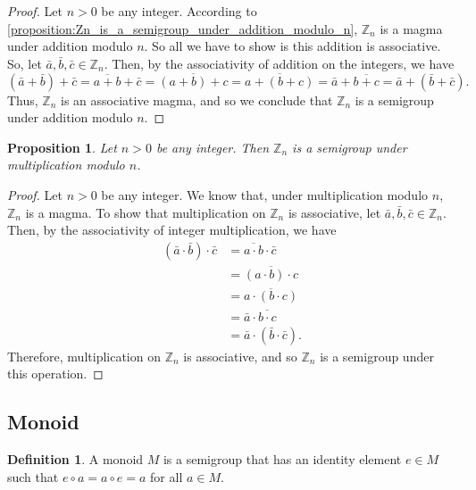 \documentclass[12pt, titlepage]{amsart}
\newcommand\Z{{\mathbb Z}}
\newtheorem{prop}{Proposition}[subsection]
\theoremstyle{definition}
\newtheorem{definition}{Definition}[subsection]
\begin{document}
	\begin{proof}
		Let $n > 0$ be any integer.
		According to \cref{proposition:Zn_is_a_semigroup_under_addition_modulo_n}, $\Z_n$ is a magma under addition modulo $n$.
		So all we have to show is this addition is associative.
		So, let $\bar{a}, \bar{b}, \bar{c} \in \Z_n$.
		Then, by the associativity of addition on the integers, we have $$(\bar{a} + \bar{b}) + \bar{c} = \overline{a + b}  + \bar{c} = \overline{(a + b) + c} = \overline{a + (b + c)} = \bar{a} + \overline{b + c} = \bar{a} + (\bar{b} + \bar{c}).$$
		Thus, $\Z_n$ is an associative magma, and so we conclude that $\Z_n$ is a semigroup under addition modulo $n$.
	\end{proof}
	
	\begin{prop}\label{proposition:Zn_is_a_semigroup_under_multiplication_modulo_n}
		Let $n > 0$ be any integer. Then $\Z_n$ is a semigroup under multiplication modulo $n$.
	\end{prop}

	\begin{proof}
		Let $n > 0$ be any integer.
		We know that, under multiplication modulo $n$, $\Z_n$ is a magma.
		To show that multiplication on $\Z_n$ is associative, let $\bar{a}, \bar{b}, \bar{c} \in \Z_n$.
		Then, by the associativity of integer multiplication, we have 
		\begin{align*}
		(\bar{a} \cdot \bar{b}) \cdot \bar{c} 
		&= \overline{a \cdot b} \cdot \bar{c} \\
		&= \overline{(a \cdot b) \cdot c} \\
		&= \overline{a \cdot (b \cdot c)} \\
		&= \bar{a} \cdot \overline{b \cdot c} \\
		&= \bar{a} \cdot (\bar{b} \cdot \bar{c}).
		\end{align*}
		Therefore, multiplication on $\Z_n$ is associative, and so $\Z_n$ is a semigroup under this operation.		
	\end{proof}


	\subsection{Monoid}

	\begin{definition}
		A monoid $M$ is a semigroup that has an identity element $e \in M$ such that $e \circ a = a \circ e = a$ for all $a \in M$.
	\end{definition}	
\end{document}
